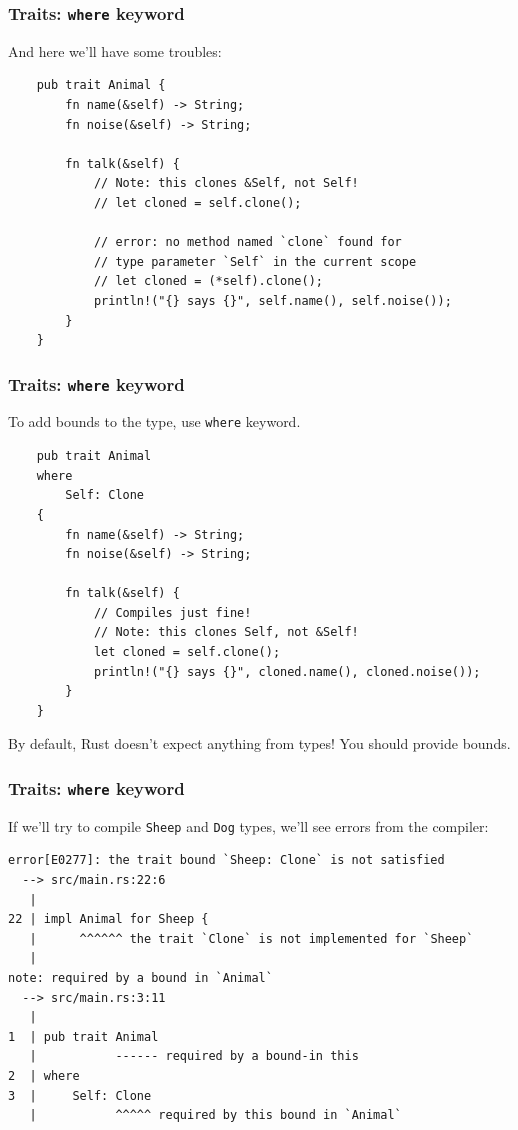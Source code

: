\documentclass[aspectratio=1610,t]{beamer}
\begin{document}

\begin{frame}[fragile]
\frametitle{Traits: \texttt{where} keyword}
And here we'll have some troubles:

\begin{verbatim}
    pub trait Animal {
        fn name(&self) -> String;
        fn noise(&self) -> String;

        fn talk(&self) {
            // Note: this clones &Self, not Self!
            // let cloned = self.clone();

            // error: no method named `clone` found for
            // type parameter `Self` in the current scope
            // let cloned = (*self).clone();
            println!("{} says {}", self.name(), self.noise());
        }
    }
\end{verbatim}
\end{frame}


\begin{frame}[fragile]
\frametitle{Traits: \texttt{where} keyword}
To add bounds to the type, use \texttt{where} keyword.

\begin{verbatim}
    pub trait Animal
    where
        Self: Clone
    {
        fn name(&self) -> String;
        fn noise(&self) -> String;

        fn talk(&self) {
            // Compiles just fine!
            // Note: this clones Self, not &Self!
            let cloned = self.clone();
            println!("{} says {}", cloned.name(), cloned.noise());
        }
    }
\end{verbatim}

By default, Rust doesn't expect anything from types! You should provide bounds.
\end{frame}


\begin{frame}[fragile]
\frametitle{Traits: \texttt{where} keyword}
If we'll try to compile \texttt{Sheep} and \texttt{Dog} types, we'll see errors from the compiler:

\begin{verbatim}
error[E0277]: the trait bound `Sheep: Clone` is not satisfied
  --> src/main.rs:22:6
   |
22 | impl Animal for Sheep {
   |      ^^^^^^ the trait `Clone` is not implemented for `Sheep`
   |
note: required by a bound in `Animal`
  --> src/main.rs:3:11
   |
1  | pub trait Animal
   |           ------ required by a bound-in this
2  | where
3  |     Self: Clone
   |           ^^^^^ required by this bound in `Animal`
\end{verbatim}
\end{frame}
\end{document}
